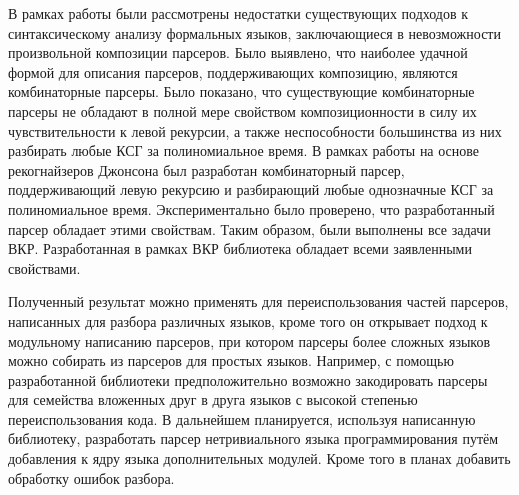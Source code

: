\documentclass[times]{itmo-student-thesis}
\begin{document}
\startconclusionpage

В рамках работы были рассмотрены недостатки существующих подходов к синтаксическому анализу формальных языков,
заключающиеся в невозможности произвольной композиции парсеров. Было выявлено, что наиболее удачной формой для описания
парсеров, поддерживающих композицию, являются комбинаторные парсеры. Было показано, что существующие комбинаторные
парсеры не обладают в полной мере свойством композиционности в силу их чувствительности к левой рекурсии, а также
неспособности большинства из них разбирать любые КСГ за полиномиальное время. В рамках работы на основе рекогнайзеров
Джонсона был разработан комбинаторный парсер, поддерживающий левую рекурсию и разбирающий любые однозначные КСГ за
полиномиальное время. Экспериментально было проверено, что разработанный парсер обладает этими свойствам. Таким
образом, были выполнены все задачи ВКР. Разработанная в рамках ВКР библиотека обладает всеми заявленными свойствами.

Полученный результат можно применять для переиспользования частей парсеров, написанных для разбора различных языков,
кроме того он открывает подход к модульному написанию парсеров, при котором парсеры более сложных языков можно собирать
из парсеров для простых языков. Например, с помощью разработанной библиотеки предположительно возможно закодировать
парсеры для семейства вложенных друг в друга языков с высокой степенью переиспользования кода. В дальнейшем планируется, 
используя написанную библиотеку, разработать парсер нетривиального языка программирования путём добавления к ядру языка 
дополнительных модулей. Кроме того в планах добавить обработку ошибок разбора.

\printmainbibliography
\end{document}
